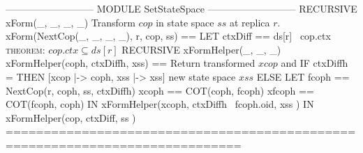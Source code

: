\documentclass{article}
\begin{document}
\begin{tla}
--------------------------- MODULE SetStateSpace ---------------------------
RECURSIVE xForm(_, _, _, _) \* Transform $cop$ in state space $ss$ at replica $r$.
xForm(NextCop(_, _, _, _), r, cop, ss) == 
    LET ctxDiff == ds[r] \ cop.ctx \* \textsc{theorem}: $cop.ctx \subseteq ds[r]$
        RECURSIVE xFormHelper(_, _, _)
        xFormHelper(coph, ctxDiffh, xss) == \* Return transformed $xcop$ and
            IF ctxDiffh = {} THEN [xcop |-> coph, xss |-> xss] \* new state space $xss$
            ELSE LET fcoph == NextCop(r, coph, ss, ctxDiffh)
                     xcoph == COT(coph, fcoph)
                    xfcoph == COT(fcoph, coph)
                 IN  xFormHelper(xcoph, ctxDiffh \ {fcoph.oid}, 
                                        xss )
    IN  xFormHelper(cop, ctxDiff, ss ) 
=============================================================================
\end{tla}
\end{document}
